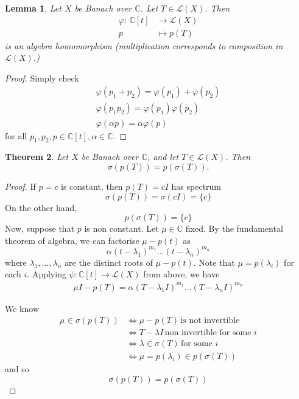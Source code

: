 \documentclass[justified]{tufte-book}
\theoremstyle{plain}%
\newtheorem{thm}{Theorem}[chapter]
\newtheorem{lem}[thm]{Lemma}
\theoremstyle{definition}
\newtheorem{exer}[thm]{Exercise}
\theoremstyle{remark}
\renewcommand{\C}{\mathbb{C}}
\newcommand{\mapping}[5]{\begin{align*}
#1 : \,     #2 &\rightarrow #3 \\
		#4  &\mapsto #5
\end{align*}	
}
\renewcommand{\phi}{\varphi}
\begin{document}
\begin{lem}
  Let $X$ be Banach over $\C$.  Let $T \in \mathcal L(X)$.  Then \mapping{\phi}{\C[t]}{\mathcal L(X)}{p}{p(T)} is an algebra homomorphism (multiplication corresponds to composition in $\mathcal L(X)$.)
\end{lem} 
\begin{proof}
  Simply check \begin{align*}
      \phi(p_1 + p_2) = \phi(p_1) + \phi(p_2) \\
      \phi(p_1 p_2) = \phi(p_1)\phi(p_2) \\
      \phi(\alpha p) = \alpha \phi(p)
  \end{align*} for all $p_1, p_2, p \in \C[t], \alpha \in \C$.  
\end{proof}
\begin{thm}
  Let $X$ be Banach over $\C$, and let $T \in \mathcal L(X)$.  Then \[
      \sigma(p(T)) = p(\sigma(T)).
  \]
\end{thm}
\begin{proof}
  If $p = c$ is constant, then $p(T) = cI$ has spectrum \[
      \sigma(p(T)) = \sigma(cI) = \{ c \}
  \]  On the other hand, \[
      p(\sigma(T)) = \{ c \}
  \]  
  Now, suppose that $p$ is non constant.  Let $\mu \in \C$ fixed.  By the fundamental theorem of algebra, we can factorise $\mu - p(t)$ as \[
      \alpha( t - \lambda_1)^{m_1} \dots (t - \lambda_n)^{m_n}
  \] where $\lambda_1, \dots, \lambda_n$ are the distinct roots of $\mu - p(t)$.  Note that $\mu = p(\lambda_i)$ for each $i$.  Applying $\psi: \C[t] \rightarrow \mathcal L(X)$ from above, we have \begin{align*}
      \mu I - p(T) = \alpha(T- \lambda_1 I)^{m_1} \dots (T - \lambda_n I)^{m_n}
  \end{align*}
  
  We know \begin{align*}
      \mu \in \sigma(p(T)) &\iff \mu - p(T) \, \text{is not invertible} \\
          &\iff T - \lambda I \, \text{non invertible for some $i$} \\
          &\iff \lambda \in \sigma(T) \, \text{for some $i$} \\
          &\iff \mu = p(\lambda_i) \in p(\sigma(T))
  \end{align*} and so \[
      \sigma(p(T)) = p(\sigma(T))
  \] 
\end{proof}
\end{document}
